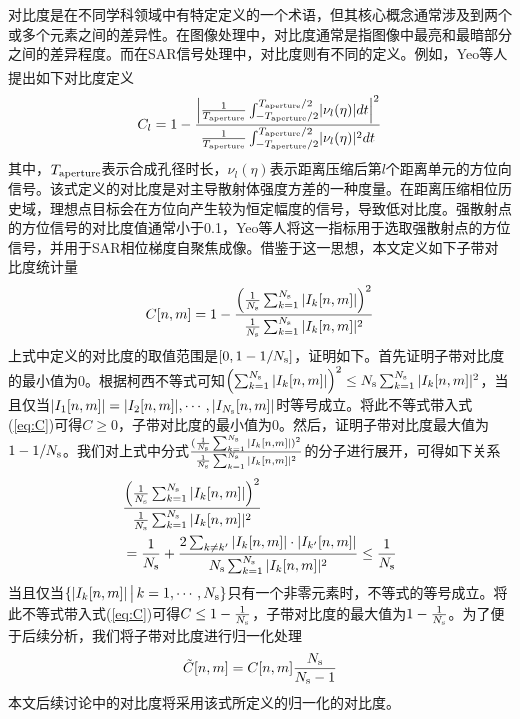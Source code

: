 \documentclass[10.5pt,UTF8]{JR}
\theoremstyle{mystyle}
\newcommand{\upcite}[1]{\textsuperscript{\cite{#1}}}
\begin{document}
对比度是在不同学科领域中有特定定义的一个术语，但其核心概念通常涉及到两个或多个元素之间的差异性。在图像处理中，对比度通常是指图像中最亮和最暗部分之间的差异程度。而在SAR信号处理中，对比度则有不同的定义。例如，Yeo等人提出如下对比度定义\upcite{chan1998noniterative}
\begin{equation}
C_l=1-\frac{\left|\frac{1}{T_{\rm aperture}}\int_{-T_{\rm aperture}/2}^{T_{\rm aperture}/2}\lvert\nu_l(\eta)\rvert dt \right|^2}{\frac{1}{T_{\rm aperture}}\int_{-T_{\rm aperture}/2}^{T_{\rm aperture}/2}\lvert\nu_l(\eta)\rvert ^2dt}
\end{equation}
其中，$T_{\rm aperture}$表示合成孔径时长，$\nu_l(\eta)$表示距离压缩后第$l$个距离单元的方位向信号。该式定义的对比度是对主导散射体强度方差的一种度量。在距离压缩相位历史域，理想点目标会在方位向产生较为恒定幅度的信号，导致低对比度。强散射点的方位信号的对比度值通常小于0.1，Yeo等人将这一指标用于选取强散射点的方位信号，并用于SAR相位梯度自聚焦成像。借鉴于这一思想，本文定义如下子带对比度统计量
\begin{equation}\label{eq:C}
C[n,m] = 1-\frac{\left(\frac{1}{N_{\rm s}}\sum_{k=1}^{N_{\rm s}} |I_k[n,m]|\right)^2}{\frac{1}{N_{\rm s}}\sum_{k=1}^{N_{\rm s}}|I_k[n,m]|^2}
\end{equation}
上式中定义的对比度的取值范围是$[0,1-1/N_{\rm s}]$，证明如下。首先证明子带对比度的最小值为0。根据柯西不等式可知$\left(\sum_{k=1}^{N_{\rm s}} |I_k[n,m]|\right)^2\le{{N_{\rm s}}\sum_{k=1}^{N_{\rm s}} |I_k[n,m]|^2}$，当且仅当$|I_1[n,m]|=|I_2[n,m]|,\cdots,|I_{N_{\rm s}}[n,m]|$时等号成立。将此不等式带入式(\ref{eq:C})可得$C\ge 0$，子带对比度的最小值为0。然后，证明子带对比度最大值为$1-1/N_{\rm s}$。我们对上式中分式$\frac{(\frac{1}{N_{\rm s}}\sum_{k=1}^{N_{\rm s}} |I_k[n,m]|)^2}{\frac{1}{N_{\rm s}}\sum_{k=1}^{N_{\rm s}} |I_k[n,m]|^2}$的分子进行展开，可得如下关系
\begin{equation}\label{}
\begin{split}
  &\frac{\left(\frac{1}{N_{\rm s}}\sum_{k=1}^{N_{\rm s}} |I_k[n,m]|\right)^2}{\frac{1}{N_{\rm s}}\sum_{k=1}^{N_{\rm s}} |I_k[n,m]|^2} \\
  &= \frac{1}{N_{\rm s}} + \frac{ 2\sum_{k\neq k'} |I_k[n,m]|\cdot|I_{k'}[n,m]|}{{N_{\rm s}}\sum_{k=1}^{N_{\rm s}} |I_k[n,m]|^2}  \le \frac{1}{N_{\rm s}}
\end{split}
\end{equation}
当且仅当$\{|I_k[n,m]|\,\big| \, k=1,\cdots,N_{\rm s}\}$只有一个非零元素时，不等式的等号成立。将此不等式带入式(\ref{eq:C})可得$C\le 1-\frac{1}{N_{\rm s}}$，子带对比度的最大值为$1-\frac{1}{N_{\rm s}}$。为了便于后续分析，我们将子带对比度进行归一化处理
\begin{equation}\label{}
  \tilde{C}[n,m] = C[n,m]\frac{N_{\rm s}}{N_{\rm s}-1}
\end{equation}
本文后续讨论中的对比度将采用该式所定义的归一化的对比度。
\end{document}
